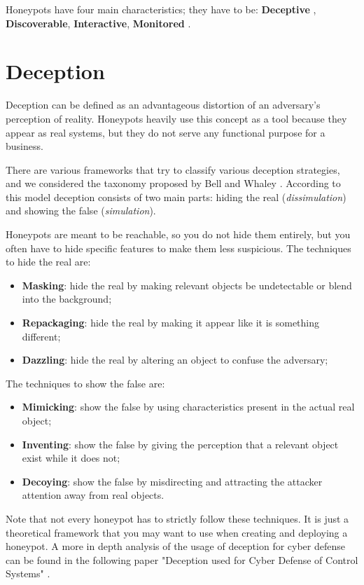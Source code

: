 \documentclass[epsfig,a4paper,11pt,titlepage,oneside,openany]{book}
\begin{document}
Honeypots have four main characteristics; they have to be: \textbf{Deceptive} , \textbf{Discoverable}, \textbf{Interactive}, \textbf{Monitored} \cite{sanders2020intrusion}.

\section{Deception}

Deception can be defined as an advantageous distortion of an adversary's perception of reality. Honeypots heavily use this concept as a tool because they appear as real systems, but they do not serve any functional purpose for a business.

There are various frameworks that try to classify various deception strategies, and we considered the taxonomy proposed by Bell and Whaley \cite{Whaley}. According to this model deception consists of two main parts: hiding the real (\textit{dissimulation}) and showing the false (\textit{simulation}).

Honeypots are meant to be reachable, so you do not hide them entirely, but you often have to hide specific features to make them less suspicious.
The techniques to hide the real are:
\begin{itemize}
\itemsep0em
\item \textbf{Masking}: hide the  real by making relevant objects be undetectable or blend into the background;
\item \textbf{Repackaging}: hide the  real by making it appear like it is something different;
\item \textbf{Dazzling}: hide the real by altering an object to confuse the adversary;
\end{itemize}

The techniques to show the false are:
\begin{itemize}
\itemsep0em
\item \textbf{Mimicking}: show the false by using characteristics present in the actual real object;
\item \textbf{Inventing}: show the false by giving the perception that a relevant object exist while it does not;
\item \textbf{Decoying}: show the false by misdirecting and attracting the attacker attention away from real objects.
\end{itemize}
Note that not every honeypot has to strictly follow these techniques. It is just a theoretical framework that you may want to use when creating and deploying a honeypot.
A more in depth analysis of the usage of deception for cyber defense can be found in the following paper "Deception used for Cyber Defense of  Control Systems" \cite{deception_defense}.
\end{document}
